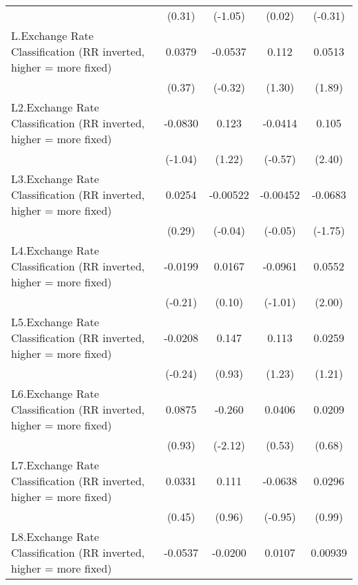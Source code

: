 {\begin{tabular}{l*{4}{c}}
                &   (0.31)         &  (-1.05)         &   (0.02)         &  (-0.31)         \\
[1em]
L.Exchange Rate Classification (RR inverted, higher = more fixed)&   0.0379         &  -0.0537         &    0.112         &   0.0513         \\
                &   (0.37)         &  (-0.32)         &   (1.30)         &   (1.89)         \\
[1em]
L2.Exchange Rate Classification (RR inverted, higher = more fixed)&  -0.0830         &    0.123         &  -0.0414         &    0.105\sym{*}  \\
                &  (-1.04)         &   (1.22)         &  (-0.57)         &   (2.40)         \\
[1em]
L3.Exchange Rate Classification (RR inverted, higher = more fixed)&   0.0254         & -0.00522         & -0.00452         &  -0.0683         \\
                &   (0.29)         &  (-0.04)         &  (-0.05)         &  (-1.75)         \\
[1em]
L4.Exchange Rate Classification (RR inverted, higher = more fixed)&  -0.0199         &   0.0167         &  -0.0961         &   0.0552\sym{*}  \\
                &  (-0.21)         &   (0.10)         &  (-1.01)         &   (2.00)         \\
[1em]
L5.Exchange Rate Classification (RR inverted, higher = more fixed)&  -0.0208         &    0.147         &    0.113         &   0.0259         \\
                &  (-0.24)         &   (0.93)         &   (1.23)         &   (1.21)         \\
[1em]
L6.Exchange Rate Classification (RR inverted, higher = more fixed)&   0.0875         &   -0.260\sym{*}  &   0.0406         &   0.0209         \\
                &   (0.93)         &  (-2.12)         &   (0.53)         &   (0.68)         \\
[1em]
L7.Exchange Rate Classification (RR inverted, higher = more fixed)&   0.0331         &    0.111         &  -0.0638         &   0.0296         \\
                &   (0.45)         &   (0.96)         &  (-0.95)         &   (0.99)         \\
[1em]
L8.Exchange Rate Classification (RR inverted, higher = more fixed)&  -0.0537         &  -0.0200         &   0.0107         &  0.00939         \\

\end{tabular}}
